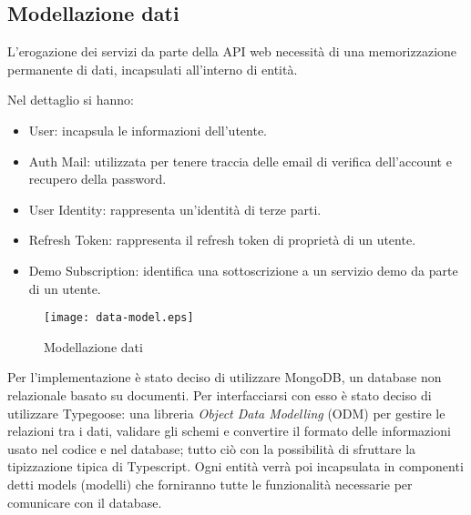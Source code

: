 \subsection{Modellazione dati}
L'erogazione dei servizi da parte della API web necessità di una memorizzazione permanente di dati, incapsulati all'interno di entità.

Nel dettaglio si hanno:
\begin{itemize}
    \itemsep0em
    \item User: incapsula le informazioni dell'utente.
    \item Auth Mail: utilizzata per tenere traccia delle email di verifica dell'account e recupero della password.
    \item User Identity: rappresenta un'identità di terze parti.
    \item Refresh Token: rappresenta il refresh token di proprietà di un utente.
    \item Demo Subscription: identifica una sottoscrizione a un servizio demo da parte di un utente.
\end{itemize}

\begin{figure}[h]
    \centering
    \texttt{[image: data-model.eps]}
    \caption{Modellazione dati}
    \label{fig:DataModel}
\end{figure}

Per l'implementazione è stato deciso di utilizzare MongoDB, un database non relazionale basato su documenti.
Per interfacciarsi con esso è stato deciso di utilizzare Typegoose\cite{Typegoose}: una libreria \textit{Object Data Modelling} (ODM) per gestire le relazioni tra i dati,
validare gli schemi e convertire il formato delle informazioni usato nel codice e nel database; tutto ciò con la possibilità di sfruttare la tipizzazione tipica di Typescript.
Ogni entità verrà poi incapsulata in componenti detti models (modelli) che forniranno tutte le funzionalità necessarie per comunicare con il database.
\newpage